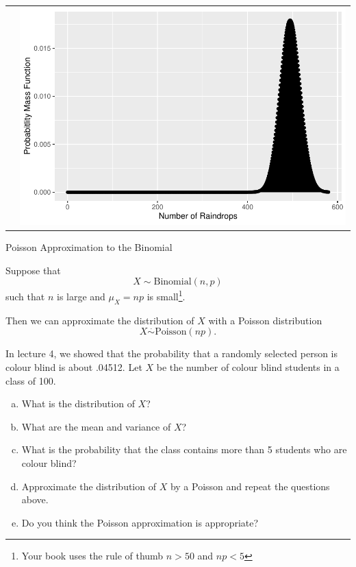 \begin{frame}
\begin{block}{\examplectd}
\begin{center}
\begin{tabular}{cc}
        & \includegraphics[width=.4\textheight]{figure/rainfall-4} \\
      \end{tabular}
    \end{center}
  \end{block}
\end{frame}

\begin{frame}

  \begin{block}{Poisson Approximation to the Binomial}
  
  Suppose that
  $$
  X \sim \mbox{Binomial}(n,p)
  $$
  such that $n$ is large and $\mu_X=np$ is small\footnote{Your book uses the rule of thumb $n>50$ and $np<5$}. 
  
  \medskip
  Then we can approximate the distribution of $X$ with a Poisson distribution
  $$
  X \overset{\cdot}{\sim} \mbox{Poisson}(np).
  $$
  
  \end{block}
\end{frame}

\begin{frame}

  \begin{block}{\example}
  In lecture 4, we showed that the probability that a randomly selected person is colour blind is about .04512. Let $X$ be the number of colour blind students in a class of 100.
  
  \begin{enumerate}[a)]
  \item What is the distribution of $X$?
  \item What are the mean and variance of $X$?
  \item What is the probability that the class contains more than 5 students who are colour blind?
  \item Approximate the distribution of $X$ by a Poisson and repeat the questions above. 
  \item Do you think the Poisson approximation is appropriate?
  \end{enumerate}
  
  \end{block}
\end{frame}

